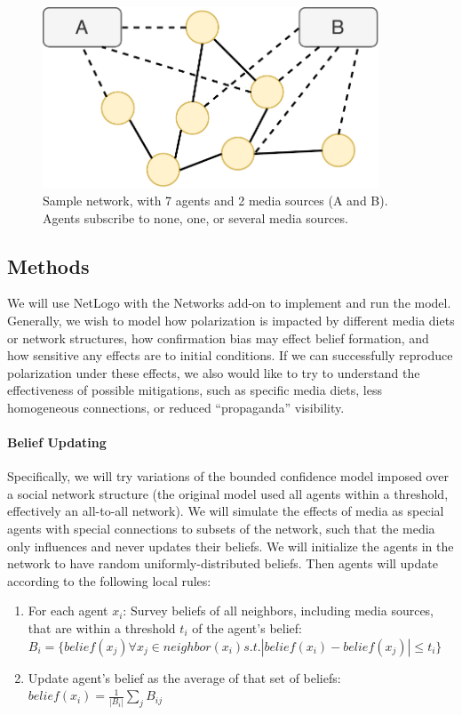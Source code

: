 \documentclass{article}
\begin{document}
\begin{figure}[ht]
  \centering
  \includegraphics[width=10cm]{pol_network.pdf}
  \caption{Sample network, with 7 agents and 2 media sources (A and B). Agents subscribe to none, one, or several media sources.}
  \label{fig:fig1}
\end{figure}

\subsection{Methods}

We will use NetLogo with the Networks add-on to implement and run the model. Generally, we wish to model how polarization is impacted by different media diets or network structures, how confirmation bias may effect belief formation, and how sensitive any effects are to initial conditions. If we can successfully reproduce polarization under these effects, we also would like to try to understand the effectiveness of possible mitigations, such as specific media diets, less homogeneous connections, or reduced ``propaganda'' visibility. 

\paragraph{Belief Updating}

Specifically, we will try variations of the bounded confidence model imposed over a social network structure (the original model used all agents within a threshold, effectively an all-to-all network). We will simulate the effects of media as special agents with special connections to subsets of the network, such that the media only influences and never updates their beliefs. We will initialize the agents in the network to have random uniformly-distributed beliefs. Then agents will update according to the following local rules:
\begin{enumerate}
    \item For each agent $x_i$: Survey beliefs of all neighbors, including media sources, that are within a threshold $t_i$ of the agent's belief: $B_i = \{belief(x_j) \forall x_j \in neighbor(x_i) s.t. |belief(x_i) - belief(x_j)| \leq t_i \}$
    \item Update agent's belief as the average of that set of beliefs: $belief(x_i) = \frac{1}{|B_i|} \sum_j B_{ij}$
\end{enumerate}
\end{document}

